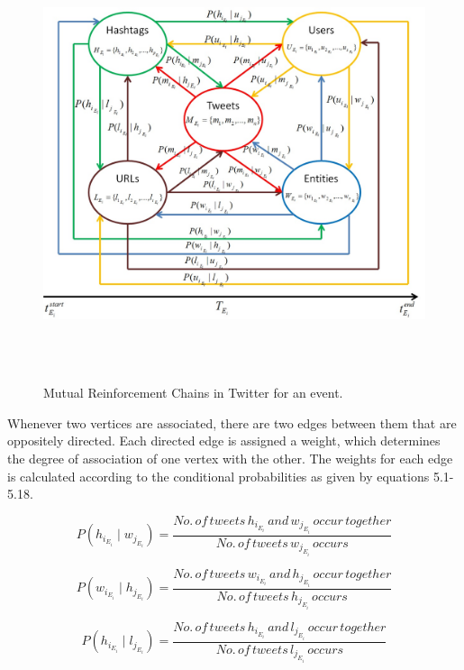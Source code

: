 \begin{figure}[htbp]
\centering
\caption{Mutual Reinforcement Chains in Twitter for an event.}    
\includegraphics[width=16cm,height=12cm]{Figures/TwitterEventInfoGraph.jpg}
\label{mrc}
\end{figure}
 

Whenever two vertices are associated, there are two edges between them that are oppositely directed. Each directed edge is assigned a weight, which determines the degree of association of one vertex with the other. The weights for each edge is calculated according to the conditional probabilities as given by equations 5.1-5.18. 

\begin{equation}
P(h_{i_{E_{i}}} \mid w_{j_{E_{i}}}) = \frac{No. \, of \, tweets \, h_{i_{E_{i}}} \, and \, w_{j_{E_{i}}} \, occur \, together}{No. \, of \, tweets \, w_{j_{E_{i}}} \, occurs}
\end{equation}

\begin{equation}
P(w_{i_{E_{i}}} \mid h_{j_{E_{i}}}) = \frac{No. \, of \, tweets \, w_{i_{E_{i}}} \, and \, h_{j_{E_{i}}} \, occur \, together}{No. \, of \, tweets \, h_{j_{E_{i}}} \, occurs}
\end{equation}

\begin{equation}
P(h_{i_{E_{i}}} \mid l_{j_{E_{i}}}) = \frac{No. \, of \, tweets \, h_{i_{E_{i}}} \, and \, l_{j_{E_{i}}} \, occur \, together}{No. \, of \, tweets \, l_{j_{E_{i}}} \, occurs}
\end{equation}

